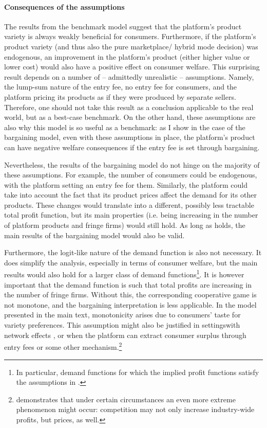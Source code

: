 \documentclass[a4paper]{article}
\begin{document}
\paragraph{Consequences of the assumptions}
The results from the benchmark model suggest that the platform's product variety is always weakly beneficial for consumers.
Furthermore, if the platform's product variety (and thus also the pure marketplace/ hybrid mode decision) was endogenous, an improvement in the platform's product (either higher value or lower cost) would also have a positive effect on consumer welfare.
This surprising result depends on a number of -- admittedly unrealistic -- assumptions.
Namely, the lump-sum nature of the entry fee, no entry fee for consumers, and the platform pricing its products as if they were produced by separate sellers.
Therefore, one should not take this result as a conclusion applicable to the real world, but as a best-case benchmark.
On the other hand, these assumptions are also why this model is so useful as a benchmark: as I show in the case of the bargaining model, even with these assumptions in place, the platform's product can have negative welfare consequences if the entry fee is set through bargaining.

Nevertheless, the results of the bargaining model do not hinge on the majority of these assumptions.
For example, the number of consumers could be endogenous, with the platform setting an entry fee for them.
Similarly, the platform could take into account the fact that its product prices affect the demand for its other products.
These changes would translate into a different, possibly less tractable total profit function, but its main properties (i.e. being increasing in the number of platform products and fringe firms) would still hold.
As long as  holds, the main results of the bargaining model would also be valid.

Furthermore, the logit-like nature of the demand function is also not necessary.
It does simplify the analysis, especially in terms of consumer welfare, but the main results would also hold for a larger class of demand functions\footnote{
    In particular, demand functions for which the implied profit functions satisfy the assumptions in .
}.
It is however important that the demand function is such that total profits are increasing in the number of fringe firms.
Without this, the corresponding cooperative game is not monotone, and the bargaining interpretation is less applicable.
In the model presented in the main text, monotonicity arises due to consumers' taste for variety preferences.
This assumption might also be justified in settingswith network effects \parencite{rochet2003platform}, or when the platform can extract consumer surplus through entry fees or some other mechanism.\footnote{
    \textcite{chen2008price} demonstrates that under certain circumstances an even more extreme phenomenon might occur: competition may not only increase industry-wide profits, but prices, as well.
}
\end{document}
